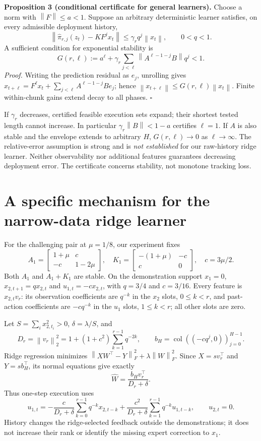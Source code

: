 \documentclass[11pt]{article}
\newcommand{\norm}[1]{\left\lVert#1\right\rVert}
\begin{document}
\medskip
\noindent\textbf{Proposition 3 (conditional certificate for general learners).}
Choose a norm with $\norm{F}\le a<1$. Suppose an arbitrary deterministic learner satisfies, on every admissible deployment history,
\[
\norm{\hat\pi_{r,j}(z_t)-KF^jx_t}\le\gamma_r q^j\norm{x_t},\qquad 0<q<1.
\]
A sufficient condition for exponential stability is
\[
G(r,\ell):=a^\ell+\gamma_r\sum_{j<\ell}\norm{A^{\ell-1-j}B}q^j<1.
\]
\emph{Proof.} Writing the prediction residual as $e_j$, unrolling gives
$x_{t+\ell}=F^\ell x_t+\sum_{j<\ell}A^{\ell-1-j}Be_j$; hence
$\norm{x_{t+\ell}}\le G(r,\ell)\norm{x_t}$. Finite within-chunk gains extend decay to all phases. $\square$

If $\gamma_r$ decreases, certified feasible execution sets expand; their shortest tested length cannot increase. In particular $\gamma_r\norm{B}<1-a$ certifies $\ell=1$. If $A$ is also stable and the envelope extends to arbitrary $H$, $G(r,\ell)\to0$ as $\ell\to\infty$. The relative-error assumption is strong and is \emph{not established} for our raw-history ridge learner. Neither observability nor additional features guarantees decreasing deployment error. The certificate concerns stability, not monotone tracking loss.

\newpage
\section{A specific mechanism for the narrow-data ridge learner}
For the challenging pair at $\mu=1/8$, our experiment fixes
\[
A_1=\begin{bmatrix}1+\mu&c\\-c&1-2\mu\end{bmatrix},\quad
K_1=\begin{bmatrix}-(1+\mu)&-c\\c&0\end{bmatrix},\quad c=3\mu/2.
\]
Both $A_1$ and $A_1+K_1$ are stable. On the demonstration support $x_1=0$,
$x_{2,t+1}=qx_{2,t}$ and $u_{1,t}=-cx_{2,t}$, with $q=3/4$ and $c=3/16$.
Every feature is $x_{2,t}v_r$: its observation coefficients are $q^{-k}$ in the $x_2$ slots, $0\le k<r$, and past-action coefficients are $-cq^{-k}$ in the $u_1$ slots, $1\le k<r$; all other slots are zero.

Let $S=\sum_i x_{2,t_i}^2>0$, $\delta=\lambda/S$, and
\[
D_r=\norm{v_r}_2^2=1+(1+c^2)\sum_{k=1}^{r-1}q^{-2k},\qquad
b_H=\operatorname{col}((-cq^j,0))_{j=0}^{H-1}.
\]
Ridge regression minimizes $\norm{XW^\top-Y}_F^2+\lambda\norm{W}_F^2$.
Since $X=s v_r^\top$ and $Y=s b_H^\top$, its normal equations give exactly
\[
\widehat W=\frac{b_Hv_r^\top}{D_r+\delta}.
\]
Thus one-step execution uses
\[
u_{1,t}=-\frac{c}{D_r+\delta}\sum_{k=0}^{r-1}q^{-k}x_{2,t-k}
+\frac{c^2}{D_r+\delta}\sum_{k=1}^{r-1}q^{-k}u_{1,t-k},\qquad u_{2,t}=0.
\]
History changes the ridge-selected feedback outside the demonstrations; it does not increase their rank or identify the missing expert correction to $x_1$.
\end{document}
